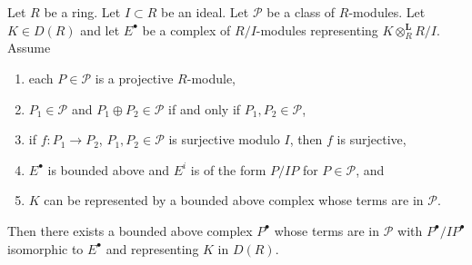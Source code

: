 \begin{lemma}
\label{lemma-lift-complex}
Let $R$ be a ring. Let $I \subset R$ be an ideal. Let $\mathcal{P}$
be a class of $R$-modules.
Let $K \in D(R)$ and let $E^\bullet$ be a complex of $R/I$-modules
representing $K \otimes_R^\mathbf{L} R/I$. Assume
\begin{enumerate}
\item each $P \in \mathcal{P}$ is a projective $R$-module,
\item $P_1 \in \mathcal{P}$ and $P_1 \oplus P_2 \in \mathcal{P}$
if and only if $P_1, P_2 \in \mathcal{P}$,
\item if $f : P_1 \to P_2$, $P_1, P_2 \in \mathcal{P}$ is surjective
modulo $I$, then $f$ is surjective,
\item $E^\bullet$ is bounded above and $E^i$ is of the form $P/IP$
for $P \in \mathcal{P}$, and
\item $K$ can be represented by a bounded above complex
whose terms are in $\mathcal{P}$.
\end{enumerate}
Then there exists a bounded above complex $P^\bullet$ whose terms
are in $\mathcal{P}$ with $P^\bullet/IP^\bullet$ isomorphic to
$E^\bullet$ and representing $K$ in $D(R)$.
\end{lemma}

